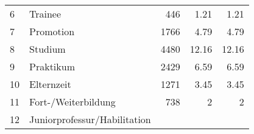 \begin{longtable}{lXrrr}
     6 &
     \multicolumn{1}{X}{ Trainee   } &


       \num{446} &
       \num[round-mode=places,round-precision=2]{1,21} &
         \num[round-mode=places,round-precision=2]{1,21} \\

     7 &
     \multicolumn{1}{X}{ Promotion   } &


       \num{1766} &
       \num[round-mode=places,round-precision=2]{4,79} &
         \num[round-mode=places,round-precision=2]{4,79} \\

     8 &
     \multicolumn{1}{X}{ Studium   } &


       \num{4480} &
       \num[round-mode=places,round-precision=2]{12,16} &
         \num[round-mode=places,round-precision=2]{12,16} \\

     9 &
     \multicolumn{1}{X}{ Praktikum   } &


       \num{2429} &
       \num[round-mode=places,round-precision=2]{6,59} &
         \num[round-mode=places,round-precision=2]{6,59} \\

     10 &
     \multicolumn{1}{X}{ Elternzeit   } &


       \num{1271} &
       \num[round-mode=places,round-precision=2]{3,45} &
         \num[round-mode=places,round-precision=2]{3,45} \\

     11 &
     \multicolumn{1}{X}{ Fort-/Weiterbildung   } &


       \num{738} &
       \num[round-mode=places,round-precision=2]{2} &
         \num[round-mode=places,round-precision=2]{2} \\

     12 &
     \multicolumn{1}{X}{ Juniorprofessur/Habilitation   } &



\end{longtable}
